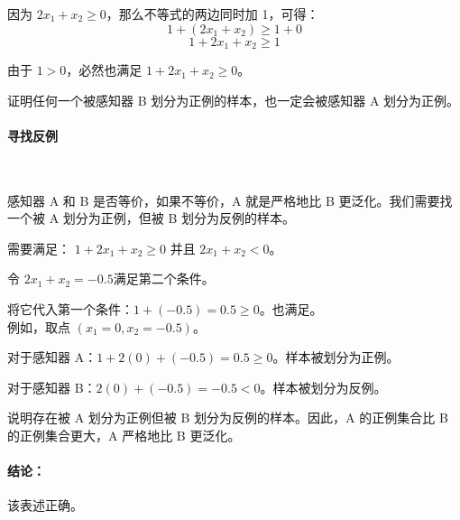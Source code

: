 \documentclass{article}
\begin{document}
    因为 $2x_1 + x_2 \ge 0$，那么不等式的两边同时加 1，可得：
        \[ 1 + (2x_1 + x_2) \ge 1 + 0 \]
        \[ 1 + 2x_1 + x_2 \ge 1 \]
    
    由于 $1 > 0$，必然也满足 $1 + 2x_1 + x_2 \ge 0$。
    
    证明任何一个被感知器 B 划分为正例的样本，也一定会被感知器 A 划分为正例。
    
    \paragraph{寻找反例}~{}
    
    感知器 A 和 B 是否等价，如果不等价，A 就是严格地比 B 更泛化。我们需要找一个被 A 划分为正例，但被 B 划分为反例的样本。
    
    需要满足： $1 + 2x_1 + x_2 \ge 0$ 并且 $2x_1 + x_2 < 0$。
    
    令 $2x_1 + x_2 = -0.5$满足第二个条件。
    
    将它代入第一个条件：$1 + (-0.5) = 0.5 \ge 0$。也满足。\\
    
    例如，取点 $(x_1 = 0, x_2 = -0.5)$。
        
    对于感知器 A：$1 + 2(0) + (-0.5) = 0.5 \ge 0$。样本被划分为正例。
    
    对于感知器 B：$2(0) + (-0.5) = -0.5 < 0$。样本被划分为反例。
    
    说明存在被 A 划分为正例但被 B 划分为反例的样本。因此，A 的正例集合比 B 的正例集合更大，A 严格地比 B 更泛化。

    \paragraph{结论：} 该表述正确。
\end{document}

